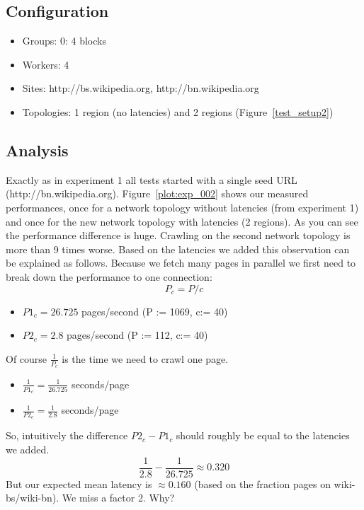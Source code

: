 \subsection{Configuration}
\begin{itemize}
  \item Groups: 0: 4 blocks
  \item Workers: 4
  \item Sites: http://bs.wikipedia.org, http://bn.wikipedia.org
  \item Topologies: 1 region (no latencies) and 2 regions (Figure~\ref{test_setup2})
\end{itemize}

\subsection{Analysis}
Exactly as in experiment 1 all tests started with a single seed URL (http://bn.wikipedia.org). Figure~\ref{plot:exp_002} shows our measured performances, once for a network topology without latencies (from experiment 1) and once for the new network topology with latencies (2 regions). As you can see the performance difference is huge. Crawling on the second network topology is more than 9 times worse. Based on the latencies we added this observation can be explained as follows. Because we fetch many pages in parallel we first need to break down the performance to one connection:
\[ 
  P_c = P / c
\]
\begin{itemize}
  \item $ P1_c = 26.725 $ pages/second (P := 1069, c:= 40) 
  \item $ P2_c = 2.8 $ pages/second (P := 112, c:= 40)
\end{itemize}
Of course $ \frac{1}{P_c} $ is the time we need to crawl one page.
\\
\begin{itemize}
  \item $ \frac{1}{P1_c} = \frac{1}{26.725} $ seconds/page
  \item $ \frac{1}{P2_c} = \frac{1}{2.8} $ seconds/page
\end{itemize}
So, intuitively the difference $ P2_c - P1_c $ should roughly be equal to the latencies we added.
\[ \frac{1}{2.8} - \frac{1}{26.725} \approx  0.320 \]
But our expected mean latency is $ \approx 0.160 $ (based on the fraction pages on wiki-bs/wiki-bn). We miss a factor 2. Why?

